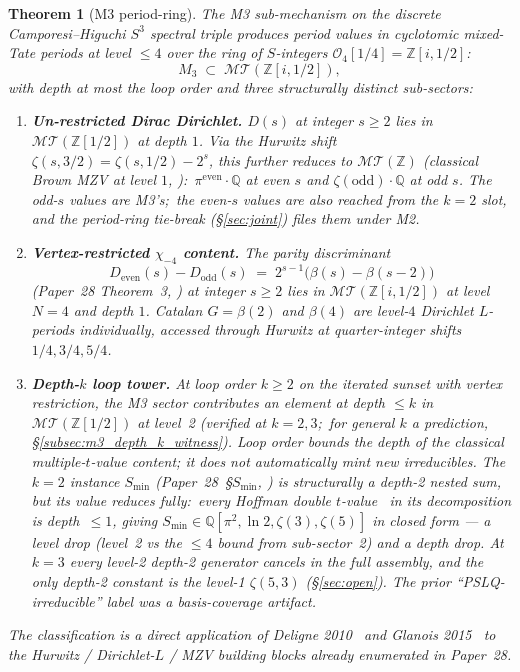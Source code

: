 \documentclass[11pt,a4paper]{article}
\theoremstyle{plain}
\newtheorem{theorem}{Theorem}[section]
\theoremstyle{definition}
\newcommand{\sthree}{S^{3}}
\newcommand{\Z}{\mathbb{Z}}
\newcommand{\Q}{\mathbb{Q}}
\newcommand{\MT}{\mathcal{MT}}
\begin{document}
\begin{theorem}[M3 period-ring]
\label{thm:m3_cyclotomic_mixed_tate}
The M3 sub-mechanism on the discrete Camporesi--Higuchi $\sthree$
spectral triple produces period values in cyclotomic mixed-Tate
periods at level $\le 4$ over the ring of $S$-integers
$\mathcal{O}_4[1/4] = \Z[i, 1/2]$:
\begin{equation}
\label{eq:m3_ring}
M_3 \;\subset\; \MT(\Z[i, 1/2]),
\end{equation}
with depth at most the loop order and three structurally distinct
sub-sectors:
\begin{enumerate}
  \item \textbf{Un-restricted Dirac Dirichlet.}  $D(s)$ at integer
    $s \ge 2$ lies in $\MT(\Z[1/2])$ at depth $1$.  Via the Hurwitz
    shift $\zeta(s, 3/2) = \zeta(s, 1/2) - 2^s$, this further reduces
    to $\MT(\Z)$ (classical Brown MZV at level $1$,
    \cite{brown2012}):\ $\pi^{\mathrm{even}}\cdot\Q$ at even $s$ and
    $\zeta(\mathrm{odd})\cdot\Q$ at odd $s$.  The odd-$s$ values are
    M3's;\ the even-$s$ values are also reached from the $k = 2$ slot,
    and the period-ring tie-break (\S\ref{sec:joint}) files them
    under M2.
  \item \textbf{Vertex-restricted $\chi_{-4}$ content.}  The parity
    discriminant
    \[
    D_{\mathrm{even}}(s) - D_{\mathrm{odd}}(s) \;=\; 2^{s-1}\bigl(\beta(s) - \beta(s-2)\bigr)
    \]
    (Paper~28 Theorem~3, \cite{loutey_paper28}) at integer $s \ge 2$
    lies in $\MT(\Z[i, 1/2])$ at level $N = 4$ and depth $1$.  Catalan
    $G = \beta(2)$ and $\beta(4)$ are level-$4$ Dirichlet $L$-periods
    individually, accessed through Hurwitz at quarter-integer shifts
    $1/4, 3/4, 5/4$.
  \item \textbf{Depth-$k$ loop tower.}  At loop order $k \ge 2$ on the
    iterated sunset with vertex restriction, the M3 sector contributes
    an element at depth $\le k$ in $\MT(\Z[1/2])$ at level~2
    (verified at $k = 2, 3$;\ for general $k$ a prediction,
    \S\ref{subsec:m3_depth_k_witness}).
    Loop order bounds the depth of the classical multiple-$t$-value
    content; it does not automatically mint new irreducibles.
    The $k = 2$ instance $S_{\min}$
    (Paper~28~\S$S_{\min}$, \cite{loutey_paper28}) is structurally a
    depth-2 nested sum, but its \emph{value} reduces fully:\ every
    Hoffman double $t$-value~\cite{hoffman2019odd} in its decomposition
    is depth~$\le 1$, giving
    $S_{\min} \in \Q[\pi^2, \ln 2, \zeta(3), \zeta(5)]$ in closed form
    --- a \emph{level drop} (level~2 vs the $\le 4$ bound from
    sub-sector~2) \emph{and} a depth drop.  At $k = 3$ every level-2
    depth-2 generator cancels in the full assembly, and the only depth-2
    constant is the level-1 $\zeta(5,3)$
    (\S\ref{sec:open}).  The prior ``PSLQ-irreducible'' label was
    a basis-coverage artifact.
\end{enumerate}
The classification is a direct application of Deligne
2010~\cite{deligne2010} and Glanois 2015~\cite{glanois2015} to the
Hurwitz / Dirichlet-$L$ / MZV building blocks already enumerated in
Paper~28.
\end{theorem}
\end{document}
